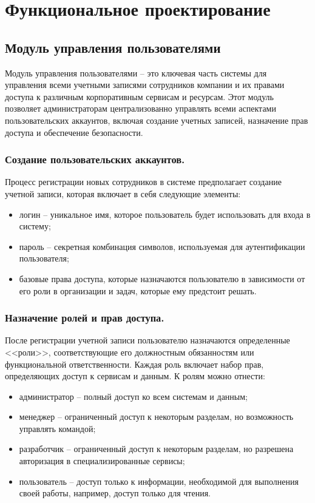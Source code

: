 \section{Функциональное проектирование}

\subsection{Модуль управления пользователями}
\label{sec:user_management_functionality}

Модуль управления пользователями -- это ключевая часть системы для управления всеми учетными записями сотрудников компании и их правами доступа к различным корпоративным сервисам и ресурсам. Этот модуль позволяет администраторам централизованно управлять всеми аспектами пользовательских аккаунтов, включая создание учетных записей, назначение прав доступа и обеспечение безопасности.

\subsubsection{Создание пользовательских аккаунтов.}
Процесс регистрации новых сотрудников в системе предполагает создание учетной записи, которая включает в себя следующие элементы:
\begin{itemize}
    \item логин -- уникальное имя, которое пользователь будет использовать для входа в систему;
    \item пароль -- секретная комбинация символов, используемая для аутентификации пользователя;
    \item базовые права доступа, которые назначаются пользователю в зависимости от его роли в организации и задач, которые ему предстоит решать.
\end{itemize}

\subsubsection{Назначение ролей и прав доступа.}
После регистрации учетной записи пользователю назначаются определенные <<роли>>, соответствующие его должностным обязанностям или функциональной ответственности. Каждая роль включает набор прав, определяющих доступ к сервисам и данным. К ролям можно отнести:
\begin{itemize}
    \item администратор -- полный доступ ко всем системам и данным;
    \item менеджер -- ограниченный доступ к некоторым разделам, но возможность управлять командой;
    \item разработчик -- ограниченный доступ к некоторым разделам, но разрешена авторизация в специализированные сервисы;
    \item пользователь -- доступ только к информации, необходимой для выполнения своей работы, например, доступ только для чтения.
\end{itemize}


